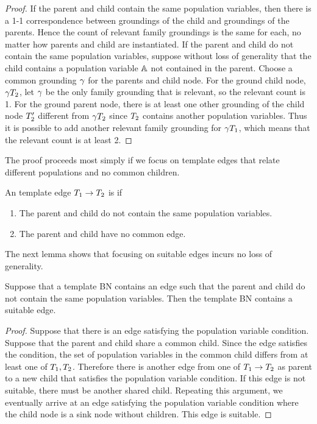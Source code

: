\documentclass[runningheads,a4paper]{llncs}
\begin{document}
\begin{proof}
If the parent and child contain the same population variables, then there is a 1-1 correspondence between groundings of the child and groundings of the parents. Hence the count of relevant family groundings is the same for each, no matter how parents and child are instantiated. If the parent and child do not contain the same population variables, suppose without loss of generality that the child contains a population variable $\mathbb{A}$ not contained in the parent. Choose a common grounding $\gamma$ for the parents and child node. For the ground child node, $\gamma T_{2}$, let $\gamma$ be the only family grounding that is relevant, so the relevant count is 1. For the  ground parent node, there is at least one other grounding of the child node $T_{2}'$ different from $\gamma T_{2}$ since $T_{2}$ contains another population variables. Thus it is possible to add another relevant family grounding for $\gamma T_{1}$, which means that the relevant count is at least 2. 
\end{proof}
The proof proceeds most simply if we focus on template edges that relate different populations and no common children.

\begin{definition} \label{def:suitable}
An template edge $T_{1} \rightarrow T_{2}$ is  if
\begin{enumerate}
\item The parent and child do not contain the same population variables.
\item The parent and child have no common edge.
\end{enumerate}
\end{definition}
The next lemma shows that focusing on suitable edges incurs no loss of generality.

\begin{lemma} \label{lemma:suitable}
Suppose that a template BN contains an edge such that the parent and child do not contain the same population variables. Then the template BN contains a suitable edge. 
\end{lemma}

\begin{proof}
Suppose that there is an edge satisfying the population variable condition. Suppose that the parent and child share a common child. Since the edge satisfies the condition, the set of population variables in the common child differs from at least one of  $T_{1}, T_{2}$. Therefore there is another edge from one of  $T_{1} \rightarrow T_{2}$ as parent to a new child that satisfies the population variable condition. If this edge is not suitable, there must be another shared child. Repeating this argument, we eventually arrive at an edge satisfying the population variable condition  where the child node is a sink node without children. This edge is suitable.
\end{proof}
\end{document}
